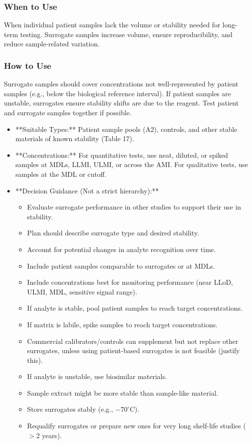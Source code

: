 \documentclass{article}
\begin{document}
\subsubsection{When to Use}
When individual patient samples lack the volume or stability needed for long-term testing. Surrogate samples increase volume, ensure reproducibility, and reduce sample-related variation.

\subsubsection{How to Use}
Surrogate samples should cover concentrations not well-represented by patient samples (e.g., below the biological reference interval). If patient samples are unstable, surrogates ensure stability shifts are due to the reagent. Test patient and surrogate samples together if possible.
\begin{itemize}
    \item **Suitable Types:** Patient sample pools (A2), controls, and other stable materials of known stability (Table 17).
    \item **Concentrations:** For quantitative tests, use neat, diluted, or spiked samples at MDLs, LLMI, ULMI, or across the AMI. For qualitative tests, use samples at the MDL or cutoff.
    \item **Decision Guidance (Not a strict hierarchy):**
    \begin{itemize}
        \item Evaluate surrogate performance in other studies to support their use in stability.
        \item Plan should describe surrogate type and desired stability.
        \item Account for potential changes in analyte recognition over time.
        \item Include patient samples comparable to surrogates or at MDLs.
        \item Include concentrations best for monitoring performance (near LLoD, ULMI, MDL, sensitive signal range).
        \item If analyte is stable, pool patient samples to reach target concentrations.
        \item If matrix is labile, spike samples to reach target concentrations.
        \item Commercial calibrators/controls can supplement but not replace other surrogates, unless using patient-based surrogates is not feasible (justify this).
        \item If analyte is unstable, use biosimilar materials.
        \item Sample extract might be more stable than sample-like material.
        \item Store surrogates stably (e.g., $-70^\circ$C).
        \item Requalify surrogates or prepare new ones for very long shelf-life studies ($>$2 years).
    \end{itemize}
\end{itemize}
\end{document}
